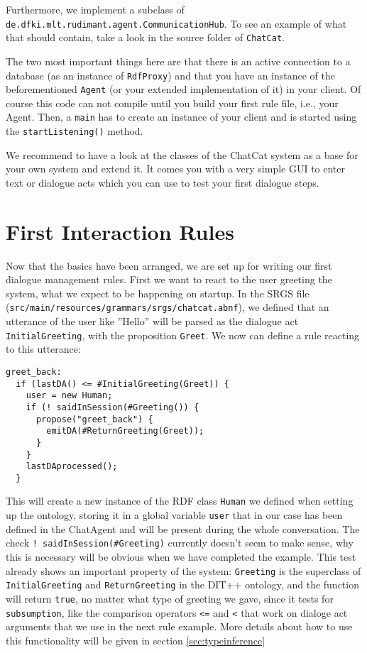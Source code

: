 Furthermore, we implement a subclass
of \texttt{de.dfki.mlt.rudimant.agent.CommunicationHub}. To see an example of
what that should contain, take a look in the source folder of \texttt{ChatCat}.

The two most important things here are that there is an active
connection to a database (as an instance of \texttt{RdfProxy}) and
that you have an instance of the beforementioned \vonda \texttt{Agent}
(or your extended implementation of it) in your client. Of course this
code can not compile until you build your first rule file, i.e., your
\vonda Agent. Then, a \texttt{main} has to create an instance of your
client and is started using the \texttt{startListening()} method.

We recommend to have a look at the classes of the ChatCat system as a base for
your own system and extend it. It comes you with a very simple GUI to enter
text or dialogue acts which you can use to test your first dialogue steps.

\section{First Interaction Rules}

Now that the basics have been arranged, we are set up for writing our first
dialogue management rules. First we want to react to the user greeting the
system, what we expect to be happening on startup. In the SRGS file
(\small\texttt{src/main/resources/grammars/srgs/chatcat.abnf}), we defined that
an utterance of the user like ''Hello'' will be parsed as the dialogue act
\texttt{InitialGreeting}, with the proposition \texttt{Greet}. We now can
define a rule reacting to this utterance:

\begin{lstlisting}
greet_back:
  if (lastDA() <= #InitialGreeting(Greet)) {
    user = new Human;
    if (! saidInSession(#Greeting()) {
      propose("greet_back") {
        emitDA(#ReturnGreeting(Greet));
      }
    }
    lastDAprocessed();
  }
\end{lstlisting}

This will create a new instance of the RDF class \texttt{Human} we defined when
setting up the ontology, storing it in a global variable \texttt{user} that in
our case has been defined in the ChatAgent and will be present during the whole
conversation. The check \texttt{!~saidInSession(\#Greeting)} currently doesn't
seem to make sense, why this is necessary will be obvious when we have
completed the example. This test already shows an important property of the
system: \texttt{Greeting} is the superclass of \texttt{InitialGreeting} and
\texttt{ReturnGreeting} in the DIT++ ontology, and the function will return
\texttt{true}, no matter what type of greeting we gave, since it tests for
\texttt{subsumption}, like the comparison operators \texttt{<=} and \texttt{<}
that work on dialoge act arguments that we use in the next rule example. More
details about how to use this functionality will be given in section
\ref{sec:typeinference}

